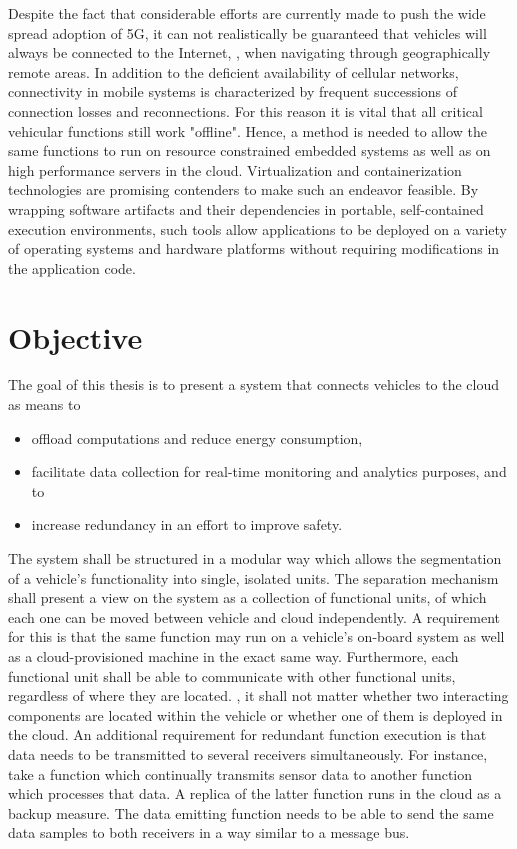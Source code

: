 Despite the fact that considerable efforts are currently made to push the wide spread adoption of 5G, it can not realistically be guaranteed that vehicles will always be connected to the Internet, \eg , when navigating through geographically remote areas. In addition to the deficient availability of cellular networks, connectivity in mobile systems is characterized by frequent successions of connection losses and reconnections. For this reason it is vital that all critical vehicular functions still work "offline". Hence, a method is needed to allow the same functions to run on resource constrained embedded systems as well as on high performance servers in the cloud. Virtualization and containerization technologies are promising contenders to make such an endeavor feasible. By wrapping software artifacts and their dependencies in portable, self-contained execution environments, such tools allow applications to be deployed on a variety of operating systems and hardware platforms without requiring modifications in the application code.

%
%
%
%
%
%
%
%
%
%

\section{Objective}
The goal of this thesis is to present a system that connects vehicles to the cloud as means to \begin{itemize}
\item offload computations and reduce energy consumption,
\item facilitate data collection for real-time monitoring and analytics purposes, and to
\item increase redundancy in an effort to improve safety.
\end{itemize} 
The system shall be structured in a modular way which allows the segmentation of a vehicle's functionality into single, isolated units. The separation mechanism shall present a view on the system as a collection of functional units, of which each one can be moved between vehicle and cloud independently. A requirement for this is that the same function may run on a vehicle's on-board system as well as a cloud-provisioned machine in the exact same way. Furthermore,  each functional unit shall be able to communicate with other functional units, regardless of where they are located. \Ie , it shall not matter whether two interacting components are located within the vehicle or whether one of them is deployed in the cloud. An additional requirement for redundant function execution is that data needs to be transmitted to several receivers simultaneously. For instance, take a function which continually transmits sensor data to another function which processes that data. A replica of the latter function runs in the cloud as a backup measure. The data emitting function needs to be able to send the same data samples to both receivers in a  way similar to a message bus.

